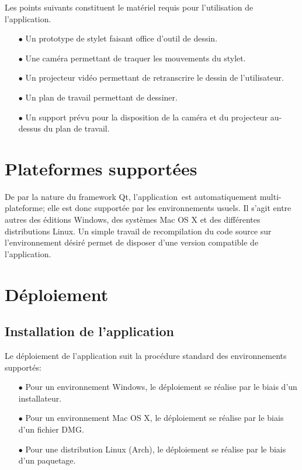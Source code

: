 \documentclass[11pt,a4paper,oldfontcommands]{memoir}
\begin{document}
Les points suivants constituent le matériel requis pour l'utilisation de l'application.

\begin{itemize}
\item[$\bullet$] Un prototype de stylet faisant office d'outil de dessin.
\item[$\bullet$] Une caméra permettant de traquer les mouvements du stylet.
\item[$\bullet$] Un projecteur vidéo permettant de retranscrire le dessin de l'utilisateur.
\item[$\bullet$] Un plan de travail permettant de dessiner.
\item[$\bullet$] Un support prévu pour la disposition de la caméra et du projecteur au-dessus du plan de travail.
\end{itemize}

\section{Plateformes supportées}

De par la nature du framework Qt, l'application est automatiquement multi-plateforme; elle est donc supportée par les environnements usuels. Il s'agit entre autres des éditions Windows, des systèmes Mac OS X et des différentes distributions Linux. Un simple travail de recompilation du code source sur l'environnement désiré permet de disposer d'une version compatible de l'application.

\section{Déploiement}

\subsection{Installation de l'application}

Le déploiement de l'application suit la procédure standard des environnements supportés:

\begin{itemize}
\item[$\bullet$] Pour un environnement Windows, le déploiement se réalise par le biais d'un installateur.
\item[$\bullet$] Pour un environnement Mac OS X, le déploiement se réalise par le biais d'un fichier DMG.
\item[$\bullet$] Pour une distribution Linux (Arch), le déploiement se réalise par le biais d'un paquetage.
\end{itemize}
\end{document}

